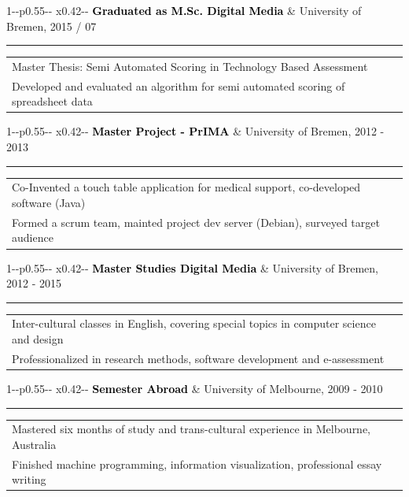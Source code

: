 \documentclass[10pt,A4]{article}
\newcommand{\mpwidth}{\linewidth-\fboxsep-\fboxsep}
\newcommand{\tzlarrow}{(0,0) -- (0.2,0) -- (0.3,0.2) -- (0.2,0.4) -- (0,0.4) -- (0.1,0.2) -- cycle;}
\newcommand{\larrow}[1]
{\begin{tikzpicture}[scale=0.58]
	 \filldraw[fill=#1!100,draw=#1!100!black]  \tzlarrow
 \end{tikzpicture}
}
\newcommand{\cvevent}[5]
{
\vspace{8pt}
	\begin{tabular*}{1\mpwidth}{p{0.55\mpwidth}  x{0.42\mpwidth}}
 	\textcolor{black}{\textbf{#2}} & \textcolor{complcol}{#3}, \textcolor{bgcol}{#1} 

	\end{tabular*}
\vspace{-12pt}
\textcolor{softcol}{\hrule}
\vspace{6pt}
	\begin{tabular*}{0.5\mpwidth}{p{\mpwidth}}
\larrow{softcol}  #4\\[3pt]
\larrow{softcol}  #5\\[6pt]
	\end{tabular*}

}
\begin{document}
{\begin{minipage}[c][0.95\textheight][t]{0.69\linewidth}
\cvevent{2015 / 07}{Graduated as M.Sc. Digital Media}{University of Bremen}{Master Thesis: Semi Automated Scoring in Technology Based Assessment}{Developed and evaluated an algorithm for semi automated scoring of spreadsheet data}


%
\cvevent{2012 - 2013}{Master Project - PrIMA}{University of Bremen}{Co-Invented a touch table application for medical support, co-developed software (Java) }{Formed a scrum team, mainted project dev server (Debian), surveyed target audience}


%
\cvevent{2012 - 2015}{Master Studies Digital Media}{University of Bremen}{Inter-cultural classes in English, covering special topics in computer science and design}{Professionalized in research methods, software development and e-assessment}


%
\cvevent{2009 - 2010}{Semester Abroad}{University of Melbourne}{Mastered six months of study and trans-cultural experience in Melbourne, Australia}{Finished machine programming, information visualization, professional essay writing}


\end{minipage}}%
\end{document}
